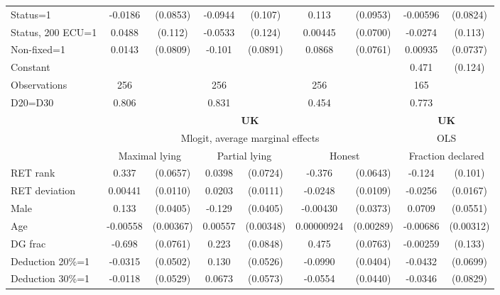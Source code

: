\begin{tabular}{l|cccccc|cc}
Status=1        &  -0.0186         & (0.0853)&  -0.0944         &  (0.107)&    0.113         & (0.0953)& -0.00596         & (0.0824)\\
Status, 200 ECU=1&   0.0488         &  (0.112)&  -0.0533         &  (0.124)&  0.00445         & (0.0700)&  -0.0274         &  (0.113)\\
Non-fixed=1     &   0.0143         & (0.0809)&   -0.101         & (0.0891)&   0.0868         & (0.0761)&  0.00935         & (0.0737)\\
Constant        &                  &         &                  &         &                  &         &    0.471\sym{***}&  (0.124)\\
\hline
Observations    &      256         &         &      256         &         &      256         &         &      165         &         \\
D20=D30         &    0.806         &         &    0.831         &         &    0.454         &         &    0.773         &         \\
\hline\hline
&\multicolumn{6}{c|}{\bf UK}&\multicolumn{2}{c}{\bf UK}\\ &\multicolumn{6}{c|}{Mlogit, average marginal effects }&\multicolumn{2}{c}{OLS}\\
                &\multicolumn{2}{c}{Maximal lying}&\multicolumn{2}{c}{Partial lying}&\multicolumn{2}{c}{Honest}  &\multicolumn{2}{c}{Fraction declared}\\
\hline
RET rank        &    0.337\sym{***}& (0.0657)&   0.0398         & (0.0724)&   -0.376\sym{***}& (0.0643)&   -0.124         &  (0.101)\\
RET deviation   &  0.00441         & (0.0110)&   0.0203\sym{*}  & (0.0111)&  -0.0248\sym{**} & (0.0109)&  -0.0256         & (0.0167)\\
Male            &    0.133\sym{***}& (0.0405)&   -0.129\sym{***}& (0.0405)& -0.00430         & (0.0373)&   0.0709         & (0.0551)\\
Age             & -0.00558         &(0.00367)&  0.00557         &(0.00348)&0.00000924         &(0.00289)& -0.00686\sym{**} &(0.00312)\\
DG frac         &   -0.698\sym{***}& (0.0761)&    0.223\sym{***}& (0.0848)&    0.475\sym{***}& (0.0763)& -0.00259         &  (0.133)\\
Deduction 20\%=1&  -0.0315         & (0.0502)&    0.130\sym{**} & (0.0526)&  -0.0990\sym{**} & (0.0404)&  -0.0432         & (0.0699)\\
Deduction 30\%=1&  -0.0118         & (0.0529)&   0.0673         & (0.0573)&  -0.0554         & (0.0440)&  -0.0346         & (0.0829)\\

\end{tabular}
